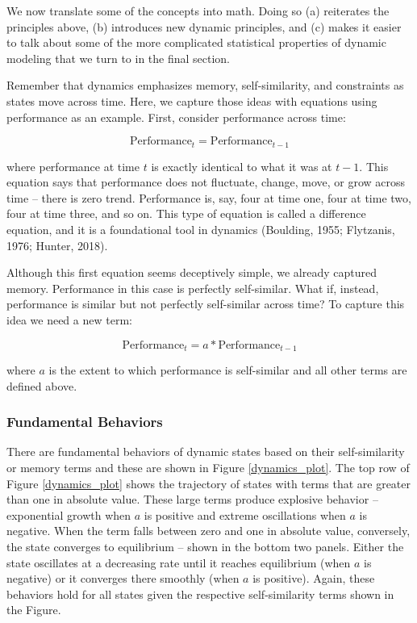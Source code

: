 \documentclass[english,,man]{apa6}
\theoremstyle{definition}
\theoremstyle{definition}
\theoremstyle{definition}
\theoremstyle{remark}
\begin{document}
We now translate some of the concepts into math. Doing so (a) reiterates
the principles above, (b) introduces new dynamic principles, and (c)
makes it easier to talk about some of the more complicated statistical
properties of dynamic modeling that we turn to in the final section.

Remember that dynamics emphasizes memory, self-similarity, and
constraints as states move across time. Here, we capture those ideas
with equations using performance as an example. First, consider
performance across time:

\begin{equation}
\textrm{Performance}_{t} = \textrm{Performance}_{t-1}
\end{equation}

\noindent where performance at time \(t\) is exactly identical to what
it was at \(t-1\). This equation says that performance does not
fluctuate, change, move, or grow across time -- there is zero trend.
Performance is, say, four at time one, four at time two, four at time
three, and so on. This type of equation is called a difference equation,
and it is a foundational tool in dynamics (Boulding, 1955; Flytzanis,
1976; Hunter, 2018).

Although this first equation seems deceptively simple, we already
captured memory. Performance in this case is perfectly self-similar.
What if, instead, performance is similar but not perfectly self-similar
across time? To capture this idea we need a new term:

\begin{equation}
\textrm{Performance}_{t} = a * \textrm{Performance}_{t-1}
\end{equation}

\noindent where \(a\) is the extent to which performance is self-similar
and all other terms are defined above.

\hypertarget{fundamental-behaviors}{%
\subsubsection{Fundamental Behaviors}\label{fundamental-behaviors}}

There are fundamental behaviors of dynamic states based on their
self-similarity or memory terms and these are shown in Figure
\ref{dynamics_plot}. The top row of Figure \ref{dynamics_plot} shows the
trajectory of states with terms that are greater than one in absolute
value. These large terms produce explosive behavior -- exponential
growth when \(a\) is positive and extreme oscillations when \(a\) is
negative. When the term falls between zero and one in absolute value,
conversely, the state converges to equilibrium -- shown in the bottom
two panels. Either the state oscillates at a decreasing rate until it
reaches equilibrium (when \(a\) is negative) or it converges there
smoothly (when \(a\) is positive). Again, these behaviors hold for all
states given the respective self-similarity terms shown in the Figure.
\end{document}
